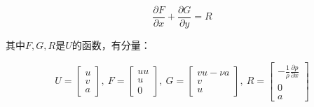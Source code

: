\documentclass[UTF8,zihao=5]{ctexart} %
\newcommand*{\pd}[2]{\frac{\partial #1}{\partial #2}}
\begin{document}

$$
\pd{F}{x}+\pd{G}{y}=R
$$

其中$F,G,R$是$U$的函数，有分量：

$$
U=\begin{bmatrix}
    u\\v\\a
\end{bmatrix},\ 
F=\begin{bmatrix}
    uu\\
    u\\
    0
\end{bmatrix},\ 
G=\begin{bmatrix}
    vu-\nu a\\
    v\\
    u
\end{bmatrix},\ 
R=\begin{bmatrix}
    -\frac{1}{\rho}\pd{p}{x}\\
    0\\
    a
\end{bmatrix}
$$
\end{document}
